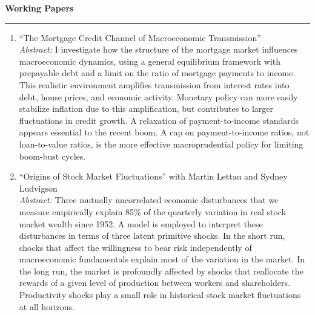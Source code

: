 \documentclass[a4paper, 10pt]{article}
\newcounter{mycounter}
\newcommand{\cvsec}[1]
{
	\needspace{2\baselineskip}
	\noindent \textbf{#1}
	
	\vspace{2pt}
	
	\hrule
	
	\bigskip
}
\newcommand{\cvpaper}[2]
{
\item #1 \\

\emph{Abstract:} #2 \\ 	
}
\newenvironment{cvcontinue}[1]
{
	\cvsec{#1}
	\begin{enumerate}
		\setcounter{enumi}{\themycounter}
	}
	{
	\setcounter{mycounter}{\theenumi}
	\end{enumerate}
}
\begin{document}
\begin{cvcontinue}{Working Papers}
	\cvpaper{``The Mortgage Credit Channel of Macroeconomic Transmission''}{
	I investigate how the structure of the mortgage market influences macroeconomic dynamics, using a
general equilibrium framework with prepayable debt and a limit on the ratio of mortgage payments to income.
This realistic environment amplifies transmission from interest
rates into debt, house prices, and economic activity. Monetary policy can more easily stabilize inflation due to this amplification, but
contributes to larger fluctuations in credit growth. A relaxation of
payment-to-income standards appears essential to the recent boom. A cap on payment-to-income ratios, not loan-to-value
ratios, is the more effective macroprudential policy for limiting boom-bust cycles.
		}
	
	\cvpaper{``Origins of Stock Market Fluctuations'' with Martin Lettau and Sydney Ludvigson}
	{
	Three mutually uncorrelated economic disturbances that we measure
	empirically explain 85\% of the quarterly variation in real stock market
	wealth since 1952. A model is employed to interpret these disturbances in
	terms of three latent primitive shocks. In the short run, shocks that affect
	the willingness to bear risk independently of macroeconomic fundamentals
	explain most of the variation in the market. In the long run, the market is
	profoundly affected by shocks that reallocate the rewards of a given level
	of production between workers and shareholders. Productivity shocks play a
	small role in historical stock market fluctuations at all horizons.	
	}
	
\end{cvcontinue}

\end{document}
